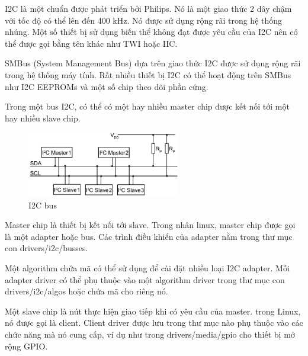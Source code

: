 
I2C là một chuẩn được phát triển bởi Philips. Nó là một giao thức 2 dây chậm với tốc độ có thể lên đến 400 kHz. Nó được sử dụng rộng rãi trong hệ thống nhúng. Một số thiết bị sử dụng biến thể không đạt được yêu cầu của I2C nên có thể được gọi bằng tên khác như TWI hoặc IIC.

SMBus (System Management Bus) dựa trên giao thức I2C được sử dụng rộng rãi trong hệ thống máy tính. Rất nhiều thiết bị I2C có thể hoạt động trên SMBus như I2C EEPROMs và một số chip theo dõi phần cứng.

Trong một bus I2C, có thể có một hay nhiều master chip được kết nối tới một hay nhiều slave chip.


\begin{figure}[H]
	\centering
	\includegraphics[width=0.6\textwidth]{../images/I2C-Bus-Layout.jpg}
	\caption{I2C bus}
\end{figure}


Master chip là thiết bị kết nối tới slave. Trong nhân linux, master chip được gọi là một adapter hoặc bus. Các trình điều khiển của adapter nằm trong thư mục con drivers/i2c/busses.

Một algorithm chứa mã có thể sử dụng để cài đặt nhiều loại I2C adapter. Mỗi adapter driver có thể phụ thuộc vào một algorithm driver trong thư mục con drivers/i2c/algos hoặc chứa mã cho riêng nó.

Một slave chip là nút thực hiện giao tiếp khi có yêu cầu của master. trong Linux, nó được gọi là client. Client driver được lưu trong thư mục nào phụ thuộc vào các chức năng mà nó cung cấp, ví dụ như trong drivers/media/gpio cho thiết bị mở rộng GPIO.
